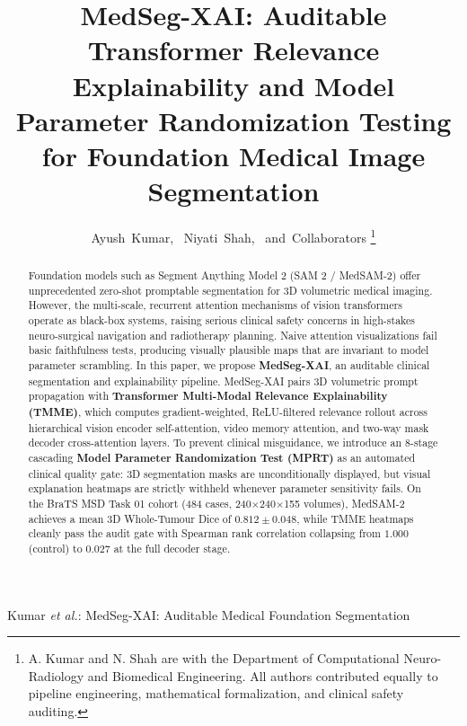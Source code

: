 \documentclass[journal,10pt,twocolumn]{IEEEtran}
\begin{document}
\title{MedSeg-XAI: Auditable Transformer Relevance Explainability and Model Parameter Randomization Testing for Foundation Medical Image Segmentation}

\author{Ayush~Kumar,~
        Niyati~Shah,~
        and~Collaborators%
\thanks{A. Kumar and N. Shah are with the Department of Computational Neuro-Radiology and Biomedical Engineering. All authors contributed equally to pipeline engineering, mathematical formalization, and clinical safety auditing.}%
}

%
{Kumar \MakeLowercase{\textit{et al.}}: MedSeg-XAI: Auditable Medical Foundation Segmentation}

\maketitle

\begin{abstract}
Foundation models such as Segment Anything Model 2 (SAM 2 / MedSAM-2) offer unprecedented zero-shot promptable segmentation for 3D volumetric medical imaging. However, the multi-scale, recurrent attention mechanisms of vision transformers operate as black-box systems, raising serious clinical safety concerns in high-stakes neuro-surgical navigation and radiotherapy planning. Naive attention visualizations fail basic faithfulness tests, producing visually plausible maps that are invariant to model parameter scrambling. In this paper, we propose \textbf{MedSeg-XAI}, an auditable clinical segmentation and explainability pipeline. MedSeg-XAI pairs 3D volumetric prompt propagation with \textbf{Transformer Multi-Modal Relevance Explainability (TMME)}, which computes gradient-weighted, ReLU-filtered relevance rollout across hierarchical vision encoder self-attention, video memory attention, and two-way mask decoder cross-attention layers. To prevent clinical misguidance, we introduce an 8-stage cascading \textbf{Model Parameter Randomization Test (MPRT)} as an automated clinical quality gate: 3D segmentation masks are unconditionally displayed, but visual explanation heatmaps are strictly withheld whenever parameter sensitivity fails. On the BraTS MSD Task 01 cohort (484 cases, 240$\times$240$\times$155 volumes), MedSAM-2 achieves a mean 3D Whole-Tumour Dice of $0.812 \pm 0.048$, while TMME heatmaps cleanly pass the audit gate with Spearman rank correlation collapsing from $1.000$ (control) to $0.027$ at the full decoder stage.
\end{abstract}
\end{document}
